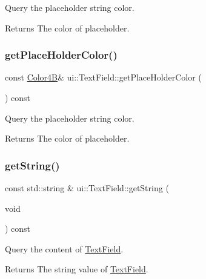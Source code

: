 Query the placeholder string color. 

\begin{DoxyReturn}{Returns}
The color of placeholder. 
\end{DoxyReturn}
\mbox{\label{classui_1_1TextField_a123ff2ed7516eb4f6374f4c27734ede9}} 
\subsubsection{\texorpdfstring{get\+Place\+Holder\+Color()}{getPlaceHolderColor()}\hspace{0.1cm}{\footnotesize\ttfamily [2/2]}}
{\footnotesize\ttfamily const \hyperlink{structColor4B}{Color4B}\& ui\+::\+Text\+Field\+::get\+Place\+Holder\+Color (\begin{DoxyParamCaption}{ }\end{DoxyParamCaption}) const}



Query the placeholder string color. 

\begin{DoxyReturn}{Returns}
The color of placeholder. 
\end{DoxyReturn}
\mbox{\label{classui_1_1TextField_aba3ac805a106d31c280b864f970eb2e1}} 
\subsubsection{\texorpdfstring{get\+String()}{getString()}\hspace{0.1cm}{\footnotesize\ttfamily [1/2]}}
{\footnotesize\ttfamily const std\+::string \& ui\+::\+Text\+Field\+::get\+String (\begin{DoxyParamCaption}\item[{void}]{ }\end{DoxyParamCaption}) const}

Query the content of \hyperlink{classui_1_1TextField}{Text\+Field}. \begin{DoxyReturn}{Returns}
The string value of \hyperlink{classui_1_1TextField}{Text\+Field}. 
\end{DoxyReturn}
\mbox{\label{classui_1_1TextField_a576e4aa7e79b9cb1bf8d7c4497c96c74}} 
